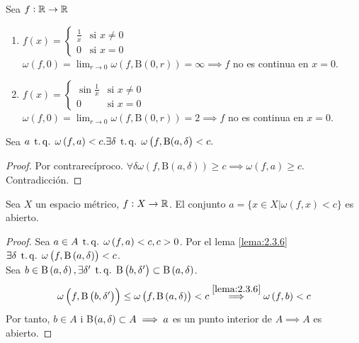 \begin{example*}
    Sea $f: \mathbb{R} \to \mathbb{R}$
    \begin{enumerate}
        \item $f(x) = \begin{cases}
            \frac{1}{x} & \text{si } x \neq 0 \\
            0 & \text{si } x = 0
            \end{cases}$ \\
            $\omega \left( f, 0 \right) = \lim_{r \to 0} \omega \left( f, \text{B} \left( 0, r \right) \right) = \infty \implies f$ no es continua en $x = 0$.
        \item $f(x) = \begin{cases}
            \sin \frac{1}{x} & \text{si } x \neq 0 \\
            0 & \text{si } x = 0
            \end{cases}$ \\
            $\omega \left( f, 0 \right) = \lim_{r \to 0} \omega \left( f, \text{B} \left( 0, r \right) \right) = 2 \implies f$ no es continua en $x = 0$.
    \end{enumerate}
\end{example*}
\begin{lema} \label{lema:2.3.6}
    Sea $a \operatorname{\;t.q.\;} \omega \left( f, a \right) < c. \exists \delta \operatorname{\;t.q.\;} \omega \left( f, \text{B}(a, \delta \right) < c.$
\end{lema}
\begin{proof}
    Por contrarecíproco. $\forall \delta \omega \left( f, \text{B} \left( a, \delta \right) \right) \geq c \implies \omega \left( f, a \right) \geq c$. Contradicción.
\end{proof}
\begin{prop}
    Sea $X$ un espacio métrico, $f : X \to \mathbb{R}$. El conjunto $a = \{ x \in X | \omega \left( f, x \right) < c \}$ es abierto.
\end{prop}
\begin{proof}
    Sea $a \in A \operatorname{\;t.q.\;} \omega \left( f, a \right) < c, c > 0$. Por el lema \ref{lema:2.3.6} $\exists \delta \operatorname{\;t.q.\;} \omega \left( f, \text{B} \left( a, \delta \right) \right) < c$. \\
    Sea $b \in \text{B} \left( a, \delta \right), \exists \delta' \operatorname{\;t.q.\;} \text{B} \left( b, \delta' \right) \subset \text{B} \left( a, \delta \right)$.
    \[
    \omega \left( f, \text{B} \left( b, \delta' \right) \right) \leq \omega \left( f, \text{B} \left( a, \delta \right) \right) < c \stackrel{\ref{lema:2.3.6}}{\implies} \omega \left( f, b \right) < c
    \]
    Por tanto, $b \in A$ i B$\left( a, \delta \right) \subset A \implies a$ es un punto interior de $A \implies A$ es abierto.
\end{proof}
